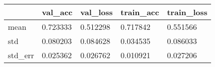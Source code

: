 \begin{tabular}{|l|l|l|l|l|}
\toprule \hline
 & val\_acc & val\_loss & train\_acc & train\_loss \\ \hline
\midrule
mean & 0.723333 & 0.512298 & 0.717842 & 0.551566 \\ \hline
std & 0.080203 & 0.084628 & 0.034535 & 0.086033 \\ \hline
std\_err & 0.025362 & 0.026762 & 0.010921 & 0.027206 \\ \hline
\bottomrule
\end{tabular}
